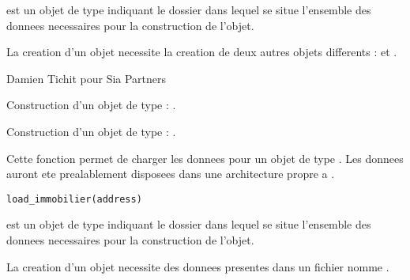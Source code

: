 \documentclass[a4paper]{book}
\begin{document}
%
\begin{Arguments}
\begin{ldescription}
\item[\code{address}] est un objet de type  indiquant le dossier dans lequel se situe l'ensemble des donnees necessaires
pour la construction de l'objet.
\end{ldescription}
\end{Arguments}
%
\begin{Details}\relax
La creation d'un objet  necessite la creation de deux autres objets differents :  et .
\end{Details}
%
\begin{Author}\relax
Damien Tichit pour Sia Partners
\end{Author}
%
\begin{SeeAlso}\relax
Construction d'un objet de type  : .

Construction d'un objet de type  : .
\end{SeeAlso}
%
\begin{Description}\relax
Cette fonction permet de charger les donnees pour un objet de type . Les donnees auront ete prealablement disposees dans
une architecture propre a .
\end{Description}
%
\begin{Usage}
\begin{verbatim}
load_immobilier(address)
\end{verbatim}
\end{Usage}
%
\begin{Arguments}
\begin{ldescription}
\item[\code{address}] est un objet de type  indiquant le dossier dans lequel se situe l'ensemble des donnees necessaires
pour la construction de l'objet.
\end{ldescription}
\end{Arguments}
%
\begin{Details}\relax
La creation d'un objet  necessite des donnees presentes dans un fichier nomme .
\end{Details}
\end{document}
